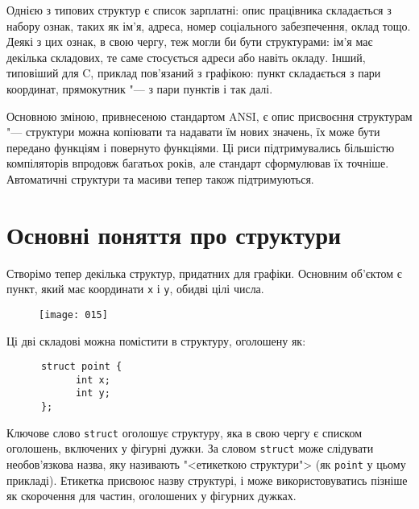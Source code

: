 \documentclass[a4paper,12pt]{book}
\begin{document}
  Однією з типових структур є список зарплатні: опис працівника складається з набору
  ознак, таких як ім'я, адреса, номер соціального забезпечення, оклад тощо. Деякі з
  цих ознак, в свою чергу, теж могли би бути структурами: ім'я має декілька
  складових, те саме стосується адреси або навіть окладу. Інший, типовіший для C, приклад
  пов'язаний з графікою: пункт складається з пари координат, прямокутник "--- з пари
  пунктів і так далі.

  Основною зміною, привнесеною стандартом ANSI, є опис присвоєння структурам "---
  структури можна копіювати та надавати їм нових значень, їх може бути передано функціям
  і повернуто функціями. Ці риси підтримувались більшістю компіляторів впродовж багатьох
  років, але стандарт сформулював їх точніше. Автоматичні структури та масиви тепер також
  підтримуються.

\section{Основні поняття про структури}


  Створімо тепер декілька структур, придатних для графіки. Основним об'єктом є пункт, який
  має координати \texttt{x} і \texttt{y}, обидві цілі числа.

%

  \begin{figure}[!htb]
  \centering
  \texttt{[image: 015]}
  \end{figure}

  Ці дві складові можна помістити в структуру, оголошену як:
  \begin{verbatim}
      struct point {
            int x;
            int y;
      };
  \end{verbatim}

  Ключове слово \texttt{struct} оголошує структуру, яка в свою чергу є списком
  оголошень, включених у фігурні дужки. За словом \texttt{struct} може слідувати
  необов'язкова назва, яку називають "<етикеткою структури"> (як \texttt{point}
  у цьому прикладі). Етикетка присвоює назву структурі, і може використовуватись пізніше
  як скорочення для частин, оголошених у фігурних дужках.
\end{document}
